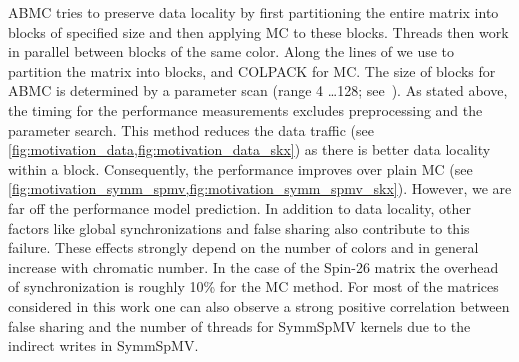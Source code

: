 \Acrshort{ABMC}\cite{ABMC} tries to preserve data locality by first partitioning
the entire matrix into blocks of specified size and then
applying \acrshort{MC} to these blocks. Threads then work in parallel
between blocks of the same color. Along the lines of \cite{Park_HPCG} 
we use \METIS \cite{METIS} to partition the matrix into blocks, and COLPACK 
for \acrshort{MC}. The size of blocks for \acrshort{ABMC} is
determined by a parameter scan (range 4 \ldots 128;
see~\cite{ABMC})\@. As stated above, the timing for the performance measurements
excludes preprocessing and the parameter search. This method reduces the 
data traffic (see \cref{fig:motivation_data,fig:motivation_data_skx}) as there is better data
locality within a block. Consequently, the performance improves
over plain \acrshort{MC} (see \cref{fig:motivation_symm_spmv,fig:motivation_symm_spmv_skx}). However,
we are far off the performance model prediction. In
addition to data locality, other factors like global synchronizations
and false sharing also contribute to this failure. These
effects strongly depend on the number of colors and in general
increase with chromatic number. In the case of the Spin-26 matrix the overhead of
synchronization is roughly 10\% for the \acrshort{MC} method.  For most of
the matrices considered in this work one can also observe a strong
positive correlation between false sharing and the number of threads
for \acrshort{SymmSpMV} kernels due to the indirect writes
in \acrshort{SymmSpMV}.
 
 




